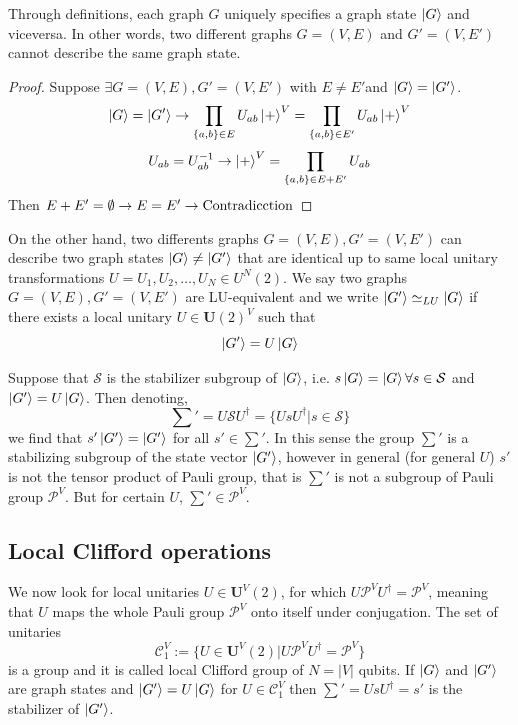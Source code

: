 \documentclass[10pt,a4paper]{book}
\numberwithin{equation}{chapter}
\numberwithin{figure}{chapter}
\numberwithin{table}{chapter}
\begin{document}
Through definitions, each graph $G$ uniquely specifies a graph state $\ket{G}$ and viceversa. In other words, two different graphs $G=(V,E)$ and $G'=(V,E')$ cannot describe the same graph state.

\begin{proof}
Suppose $\exists G=(V,E) , G'=(V,E')$ with $E\neq E'$and $\ket{G}=\ket{G'}$.
\begin{equation}
 \ket{G}=\ket{G'} \rightarrow \prod_{\lbrace a,b \rbrace \in E}U_{ab}\ket{+}^{V}= \prod_{\lbrace a,b \rbrace \in E'}U_{ab}\ket{+}^{V}
\end{equation}
\begin{equation}
U_{ab}=U^{-1}_{ab} \rightarrow \ket{+}^{V}= \prod_{\lbrace a,b \rbrace \in E+E'}U_{ab}
\end{equation}
Then $E+E'= \emptyset \rightarrow E=E' \rightarrow \textup{Contradicction}$
\end{proof}

On the other hand, two differents graphs $G=(V,E) , G'=(V,E')$ can describe two graph states $\ket{G}\neq\ket{G'}$ that are identical up to same local unitary transformations $U=U_{1},U_{2},\ldots ,U_{N} \in U^{N}(2)$. We say two graphs $G=(V,E) , G'=(V,E')$ are LU-equivalent and we write $\ket{G'}\simeq_{LU}\ket{G}$ if there exists a local unitary $U \in \textbf{U}(2)^{V}$ such that
\begin{equation}
\ket{G'}=U\ket{G}
\end{equation}

Suppose that $\mathcal{S}$ is the stabilizer subgroup of $\ket{G}$, i.e. $s\ket{G}=\ket{G} \forall s \in \mathcal{S}$ and $\ket{G'}=U\ket{G}$. Then denoting,
\begin{equation}
\sum'=U\mathcal{S}U^{\dagger}=\lbrace UsU^{\dagger} | s \in \mathcal{S} \rbrace
\end{equation}
we find that $s'\ket{G'}=\ket{G'}$ for all $s' \in \sum'$. In this sense the group $\sum '$ is a stabilizing subgroup of the state vector $\ket{G'}$, however in general (for general $U$) $s'$ is not the tensor product of Pauli group, that is $\sum'$ is not a subgroup of Pauli group $\mathcal{P}^V$. But for certain $U$, $\sum' \in \mathcal{P}^V$. 

\subsection{Local Clifford operations}
We now look for local unitaries $U \in \textbf{U}^{V}(2)$, for which $U\mathcal{P}^{V}U^{\dagger}=\mathcal{P}^{V}$, meaning that $U$ maps the whole Pauli group $\mathcal{P}^{V}$ onto itself under conjugation. The set of unitaries
\begin{equation}
\mathcal{C}^{V}_{1}:=\lbrace U \in \textbf{U}^{V}(2) | U\mathcal{P}^{V}U^{\dagger}=\mathcal{P}^{V} \rbrace
\end{equation}
is a group and it is called local Clifford group of $N=|V|$ qubits. If $\ket{G}$ and $\ket{G'}$ are graph states and $\ket{G'}=U\ket{G}$ for $U \in \mathcal{C}^{V}_{1}$ then $\sum'=UsU^{\dagger}=s'$ is the stabilizer of $\ket{G'}$. 
\end{document}
